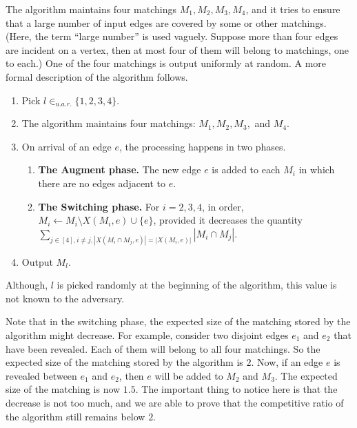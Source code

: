 \documentclass[11pt]{article}
\begin{document}
The algorithm maintains four matchings $M_1,M_2,M_3,M_4$, and it tries to ensure that a large number of input edges are covered by some or other matchings. (Here, the term ``large number'' is used vaguely. Suppose more than four edges are incident on a vertex, then at most four of them will belong to matchings, one to each.) One of the four matchings is output uniformly at random. A more formal description of the algorithm follows.
   \begin{algorithm}[H]
  \caption{Randomized Algorithm for MCM on Trees}\label{alg_rand1}
   \begin{enumerate}
    \item Pick $l\in_{u.a.r.}\{1,2,3,4\}$.
    \item The algorithm maintains four matchings: $M_1,M_2,M_3,$ and $M_4$.
    \item On arrival of an edge $e$, the processing happens in two phases.
   \begin{enumerate}
	   \item {\bf The Augment phase.} The new edge $e$
		   is added to each $M_i$ in which there are no 
		   edges  adjacent to $e$.
	   \item {\bf The Switching phase.}
		   For $i=2,3,4$, in order, $M_i\gets M_i\setminus X(M_i,e)\cup \{e\}$, provided it decreases the quantity 
 		   $\sum_{j\in[4],i\neq j, |X(M_i\cap M_j,e)| = |X(M_i,e)|}|M_i\cap M_j|$.
   \end{enumerate}
   \item Output  $M_l$.
   \end{enumerate}
 \end{algorithm}
 Although, $l$ is picked randomly at the beginning of the algorithm, this value is not known to the adversary.
 
 Note that in the switching phase, the expected size of the matching stored by the algorithm might decrease. For example, consider two disjoint edges $e_1$ and $e_2$ that have been revealed. Each of them will belong to all four matchings. So the expected size of the matching stored by the algorithm is $2$. Now, if an edge $e$ is revealed between $e_1$ and $e_2$, then $e$ will be added to $M_2$ and $M_3$. The expected size of the matching is now $1.5$. The important thing to notice here is that the decrease is not too much, and we are able to prove that the competitive ratio of the algorithm still remains below $2$.
 
\end{document}
